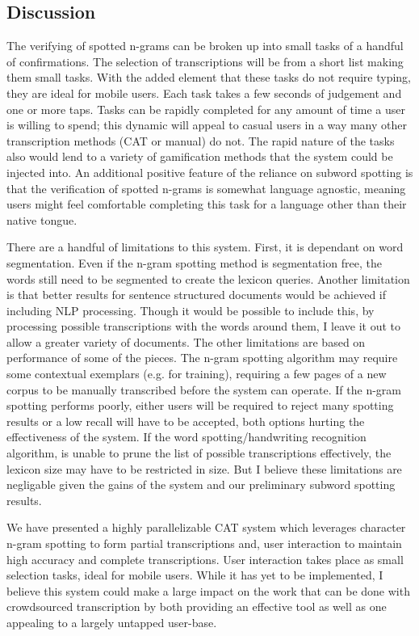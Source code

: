 \documentclass[conference]{IEEEtran}
\begin{document}
\subsection{Discussion}

The verifying of spotted n-grams can be broken up into small tasks of a handful of confirmations. The selection of transcriptions will be from a short list making them small tasks. With the added element that these tasks do not require typing, they are ideal for mobile users. Each task takes a few seconds of judgement and one or more taps. Tasks can be rapidly completed for any amount of time a user is willing to spend; this dynamic will appeal to casual users in a way many other transcription methods (CAT or manual) do not. The rapid nature of the tasks also would lend to a variety of gamification methods that the system could be injected into. An additional positive feature of the reliance on subword spotting is that the verification of spotted n-grams is somewhat language agnostic, meaning users might feel comfortable completing this task for a language other than their native tongue.

There are a handful of limitations to this system. First, it is dependant on word segmentation. Even if the n-gram spotting method is segmentation free, the words still need to be segmented to create the lexicon queries. Another limitation is that better results for sentence structured documents would be achieved if including NLP processing. Though it would be possible to include this, by processing possible transcriptions with the words around them, I leave it out to allow a greater variety of documents. The other limitations are based on performance of some of the pieces. The n-gram spotting algorithm may require some contextual exemplars (e.g. for training), requiring a few pages of a new corpus to be manually transcribed before the system can operate. If the n-gram spotting performs poorly, either users will be required to reject many spotting results or a low recall will have to be accepted, both options hurting the effectiveness of the system. If the word spotting/handwriting recognition algorithm, is unable to prune the list of possible transcriptions effectively, the lexicon size may have to be restricted in size. But I believe these limitations are negligable given the gains of the system and our preliminary subword spotting results.

We have presented a highly parallelizable CAT system which leverages character n-gram spotting to form partial transcriptions and, user interaction to maintain high accuracy and complete transcriptions. User interaction takes place as small selection tasks, ideal for mobile users. While it has yet to be implemented, I believe this system could make a large impact on the work that can be done with crowdsourced transcription by both providing an effective tool as well as one appealing to a largely untapped user-base.
\end{document}

